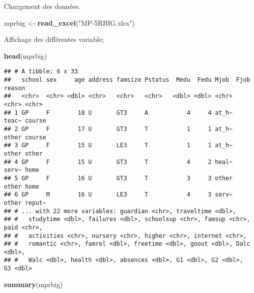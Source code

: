 \documentclass[
]{article}
\newenvironment{Shaded}{\begin{snugshade}}{\end{snugshade}}
\newcommand{\KeywordTok}[1]{\textcolor[rgb]{0.13,0.29,0.53}{\textbf{#1}}}
\newcommand{\NormalTok}[1]{#1}
\newcommand{\StringTok}[1]{\textcolor[rgb]{0.31,0.60,0.02}{#1}}
\begin{document}
Chargement des données.

\begin{Shaded}
\begin{Highlighting}[]
\NormalTok{mprbig <-}\StringTok{ }\KeywordTok{read_excel}\NormalTok{(}\StringTok{"MP-5RBIG.xlsx"}\NormalTok{)}
\end{Highlighting}
\end{Shaded}

Affichage des différentes variable;

\begin{Shaded}
\begin{Highlighting}[]
\KeywordTok{head}\NormalTok{(mprbig)}
\end{Highlighting}
\end{Shaded}

\begin{verbatim}
## # A tibble: 6 x 33
##   school sex     age address famsize Pstatus  Medu  Fedu Mjob  Fjob  reason
##   <chr>  <chr> <dbl> <chr>   <chr>   <chr>   <dbl> <dbl> <chr> <chr> <chr> 
## 1 GP     F        18 U       GT3     A           4     4 at_h~ teac~ course
## 2 GP     F        17 U       GT3     T           1     1 at_h~ other course
## 3 GP     F        15 U       LE3     T           1     1 at_h~ other other 
## 4 GP     F        15 U       GT3     T           4     2 heal~ serv~ home  
## 5 GP     F        16 U       GT3     T           3     3 other other home  
## 6 GP     M        16 U       LE3     T           4     3 serv~ other reput~
## # ... with 22 more variables: guardian <chr>, traveltime <dbl>,
## #   studytime <dbl>, failures <dbl>, schoolsup <chr>, famsup <chr>, paid <chr>,
## #   activities <chr>, nursery <chr>, higher <chr>, internet <chr>,
## #   romantic <chr>, famrel <dbl>, freetime <dbl>, goout <dbl>, Dalc <dbl>,
## #   Walc <dbl>, health <dbl>, absences <dbl>, G1 <dbl>, G2 <dbl>, G3 <dbl>
\end{verbatim}

\begin{Shaded}
\begin{Highlighting}[]
\KeywordTok{summary}\NormalTok{(mprbig)}
\end{Highlighting}
\end{Shaded}
\end{document}
